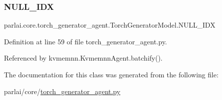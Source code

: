 \subsubsection{\texorpdfstring{N\+U\+L\+L\+\_\+\+I\+DX}{NULL\_IDX}}
{\footnotesize\ttfamily parlai.\+core.\+torch\+\_\+generator\+\_\+agent.\+Torch\+Generator\+Model.\+N\+U\+L\+L\+\_\+\+I\+DX}



Definition at line 59 of file torch\+\_\+generator\+\_\+agent.\+py.



Referenced by kvmemnn.\+Kvmemnn\+Agent.\+batchify().



The documentation for this class was generated from the following file\+:\begin{DoxyCompactItemize}
\item 
parlai/core/\hyperlink{torch__generator__agent_8py}{torch\+\_\+generator\+\_\+agent.\+py}\end{DoxyCompactItemize}
